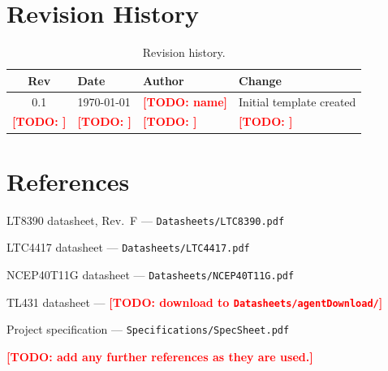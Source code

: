 \documentclass[11pt,a4paper]{article}
\newcommand{\todo}[1]{\textcolor{red}{\textbf{[TODO: #1]}}}
\begin{document}
\section{Revision History}
\begin{table}[H]
  \centering
  \begin{tabular}{@{}clll@{}}
    \toprule
    \textbf{Rev} & \textbf{Date} & \textbf{Author} & \textbf{Change} \\
    \midrule
    0.1 & \today & \todo{name} & Initial template created \\
    \todo{} & \todo{} & \todo{} & \todo{} \\
    \bottomrule
  \end{tabular}
  \caption{Revision history.}
\end{table}

\section{References}
\begin{enumerate}[label={[\arabic*]},nosep]
  \item LT8390 datasheet, Rev.~F --- \texttt{Datasheets/LTC8390.pdf}
  \item LTC4417 datasheet --- \texttt{Datasheets/LTC4417.pdf}
  \item NCEP40T11G datasheet --- \texttt{Datasheets/NCEP40T11G.pdf}
  \item TL431 datasheet --- \todo{download to \texttt{Datasheets/agentDownload/}}
  \item Project specification --- \texttt{Specifications/SpecSheet.pdf}
  \item \todo{add any further references as they are used.}
\end{enumerate}
\end{document}
